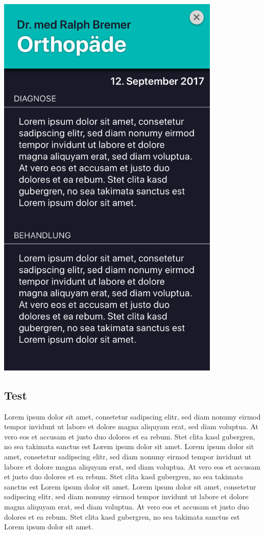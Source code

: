 \documentclass[a4paper]{scrreprt}
\begin{document}
\begin{minipage}[t][][b]{0.45\textwidth}
\includegraphics[width=0.8\textwidth]{mockups/ArztbriefDetailed}
\begin{flushleft}
\end{flushleft}
\end{minipage}%
\hfill
\begin{minipage}[t][][b]{0.45\textwidth}
\vspace{0pt}
\subsection{Test}
Lorem ipsum dolor sit amet, consetetur sadipscing elitr, sed diam nonumy eirmod tempor invidunt ut labore et dolore magna aliquyam erat, sed diam voluptua. At vero eos et accusam et justo duo dolores et ea rebum. Stet clita kasd gubergren, no sea takimata sanctus est Lorem ipsum dolor sit amet. Lorem ipsum dolor sit amet, consetetur sadipscing elitr,  sed diam nonumy eirmod tempor invidunt ut labore et dolore magna aliquyam erat, sed diam voluptua. At vero eos et accusam et justo duo dolores et ea rebum. Stet clita kasd gubergren, no sea takimata sanctus est Lorem ipsum dolor sit amet. Lorem ipsum dolor sit amet, consetetur sadipscing elitr,  sed diam nonumy eirmod tempor invidunt ut labore et dolore magna aliquyam erat, sed diam voluptua. At vero eos et accusam et justo duo dolores et ea rebum. Stet clita kasd gubergren, no sea takimata sanctus est Lorem ipsum dolor sit amet.
\end{minipage}%
\end{document}
